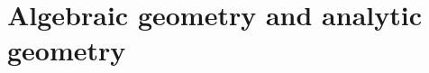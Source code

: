 \documentclass[../main.tex]{subfiles}
\begin{document}
\setcounter{chapter}{11}
\chapter{Algebraic geometry and analytic geometry}
\end{document}
